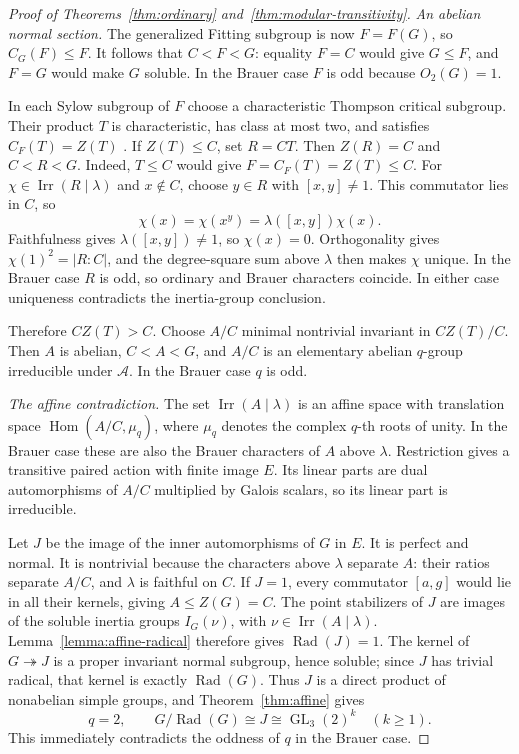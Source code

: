 \documentclass[11pt,a4paper]{amsart}
\DeclareMathOperator{\Irr}{Irr}
\DeclareMathOperator{\Rad}{Rad}
\DeclareMathOperator{\GL}{GL}
\theoremstyle{remark}
\numberwithin{equation}{section}
\begin{document}
\begin{proof}[Proof of Theorems~\ref{thm:ordinary}
and~\ref{thm:modular-transitivity}]
\smallskip\noindent\emph{An abelian normal section.}
The generalized Fitting subgroup is now $F=F(G)$, so $C_G(F)\leq F$.
It follows that $C<F<G$: equality $F=C$ would give $G\leq F$, and
$F=G$ would make $G$ soluble. In the Brauer case $F$ is odd because
$O_2(G)=1$.

In each Sylow subgroup of $F$ choose a characteristic Thompson critical
subgroup. Their product $T$ is characteristic, has class at most two,
and satisfies $C_F(T)=Z(T)$ \cite{Gorenstein}.
If $Z(T)\leq C$, set $R=CT$. Then $Z(R)=C$ and $C<R<G$.
Indeed, $T\leq C$ would give $F=C_F(T)=Z(T)\leq C$.
For $\chi\in\Irr(R\mid\lambda)$ and $x\notin C$, choose $y\in R$
with $[x,y]\ne1$. This commutator lies in $C$, so
\[
 \chi(x)=\chi(x^y)=\lambda([x,y])\chi(x).
\]
Faithfulness gives $\lambda([x,y])\ne1$, so $\chi(x)=0$.
Orthogonality gives $\chi(1)^2=|R:C|$, and the degree-square sum above
$\lambda$ then makes $\chi$ unique. In the Brauer case $R$ is odd, so
ordinary and Brauer characters coincide. In either case uniqueness
contradicts the inertia-group conclusion.

Therefore $CZ(T)>C$. Choose $A/C$ minimal nontrivial invariant in
$CZ(T)/C$. Then $A$ is abelian, $C<A<G$, and $A/C$ is an elementary
abelian $q$-group irreducible under $\mathcal A$. In the Brauer case
$q$ is odd.

\smallskip\noindent\emph{The affine contradiction.}
The set $\Irr(A\mid\lambda)$ is an affine space with translation space
$\operatorname{Hom}(A/C,\mu_q)$, where $\mu_q$ denotes the complex
$q$-th roots of unity. In the Brauer case these are also the Brauer
characters of $A$ above $\lambda$. Restriction gives a transitive paired
action with finite image $E$. Its linear parts are dual automorphisms
of $A/C$ multiplied by Galois scalars, so its linear part is irreducible.

Let $J$ be the image of the inner automorphisms of $G$ in $E$.
It is perfect and normal. It is nontrivial because the characters above
$\lambda$ separate $A$: their ratios separate $A/C$, and $\lambda$
is faithful on $C$. If $J=1$, every commutator $[a,g]$ would lie in all
their kernels, giving $A\leq Z(G)=C$.
The point stabilizers of $J$ are images of the soluble inertia groups
$I_G(\nu)$, with $\nu\in\Irr(A\mid\lambda)$.
Lemma~\ref{lemma:affine-radical} therefore gives $\Rad(J)=1$.
The kernel of $G\twoheadrightarrow J$ is a proper invariant normal
subgroup, hence soluble; since $J$ has trivial radical, that kernel is
exactly $\Rad(G)$. Thus $J$ is a direct product of nonabelian simple
groups, and Theorem~\ref{thm:affine} gives
\[
 q=2,\qquad G/\Rad(G)\cong J\cong\GL_3(2)^k\quad(k\geq1).
\]
This immediately contradicts the oddness of $q$ in the Brauer case.


\end{proof}
\end{document}
